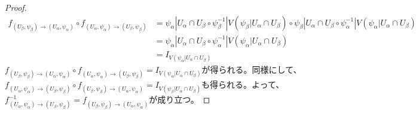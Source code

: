 \documentclass[dvipdfmx]{jsarticle}
\begin{document}
\begin{proof}
\begin{comment}
&= V\left( \psi_{\alpha}|U_{\alpha} \cap U_{\beta} \right)\overset{\psi_{\alpha}^{- 1}}{\rightarrow}U_{\alpha} \cap U_{\beta}\overset{\psi_{\beta}}{\rightarrow}V\left( \psi_{\beta}|U_{\alpha} \cap U_{\beta} \right) \cdot \overset{\psi_{\beta}^{- 1}}{\rightarrow}U_{\alpha} \cap U_{\beta}\overset{\psi_{\alpha}}{\rightarrow}V\left( \psi_{\alpha}|U_{\alpha} \cap U_{\beta} \right)\\
&= V\left( \psi_{\alpha}|U_{\alpha} \cap U_{\beta} \right)\overset{\psi_{\alpha}^{- 1}}{\rightarrow}U_{\alpha} \cap U_{\beta}\overset{I_{U_{\alpha} \cap U_{\beta}}}{\rightarrow}U_{\alpha} \cap U_{\beta}\overset{\psi_{\alpha}}{\rightarrow}V\left( \psi_{\alpha}|U_{\alpha} \cap U_{\beta} \right)\\
&= V\left( \psi_{\alpha}|U_{\alpha} \cap U_{\beta} \right)\overset{\psi_{\alpha}^{- 1}}{\rightarrow}U_{\alpha} \cap U_{\beta}\overset{\psi_{\alpha}}{\rightarrow}V\left( \psi_{\alpha}|U_{\alpha} \cap U_{\beta} \right)\\
&= V\left( \psi_{\alpha}|U_{\alpha} \cap U_{\beta} \right)\overset{I_{V\left( \psi_{\alpha}|U_{\alpha} \cap U_{\beta} \right)}}{\rightarrow}V\left( \psi_{\alpha}|U_{\alpha} \cap U_{\beta} \right)\\
&= I_{V\left( \psi_{\alpha}|U_{\alpha} \cap U_{\beta} \right)}
\end{align*}
\end{comment}
\begin{align*}
f_{\left( U_{\beta},\psi_{\beta} \right) \rightarrow \left( U_{\alpha},\psi_{\alpha} \right)} \circ f_{\left( U_{\alpha},\psi_{\alpha} \right) \rightarrow \left( U_{\beta},\psi_{\beta} \right)} &= \psi_{\alpha}|U_{\alpha} \cap U_{\beta} \circ \psi_{\beta}^{- 1}|V\left( \psi_{\beta}|U_{\alpha} \cap U_{\beta} \right) \circ \psi_{\beta}|U_{\alpha} \cap U_{\beta} \circ \psi_{\alpha}^{- 1}|V\left( \psi_{\alpha}|U_{\alpha} \cap U_{\beta} \right)\\
&= \psi_{\alpha}|U_{\alpha} \cap U_{\beta} \circ \psi_{\alpha}^{- 1}|V\left( \psi_{\alpha}|U_{\alpha} \cap U_{\beta} \right)\\
&= I_{V\left( \psi_{\alpha}|U_{\alpha} \cap U_{\beta} \right)}
\end{align*}  
$f_{\left( U_{\beta},\psi_{\beta} \right) \rightarrow \left( U_{\alpha},\psi_{\alpha} \right)} \circ f_{\left( U_{\alpha},\psi_{\alpha} \right) \rightarrow \left( U_{\beta},\psi_{\beta} \right)} = I_{V\left( \psi_{\alpha}|U_{\alpha} \cap U_{\beta} \right)}$が得られる。同様にして、$f_{\left( U_{\alpha},\psi_{\alpha} \right) \rightarrow \left( U_{\beta},\psi_{\beta} \right)} \circ f_{\left( U_{\beta},\psi_{\beta} \right) \rightarrow \left( U_{\alpha},\psi_{\alpha} \right)} = I_{V\left( \psi_{\beta}|U_{\alpha} \cap U_{\beta} \right)}$も得られる。よって、$f_{\left( U_{\alpha},\psi_{\alpha} \right) \rightarrow \left( U_{\beta},\psi_{\beta} \right)}^{- 1} = f_{\left( U_{\beta},\psi_{\beta} \right) \rightarrow \left( U_{\alpha},\psi_{\alpha} \right)}$が成り立つ。
\end{proof}
\end{document}
